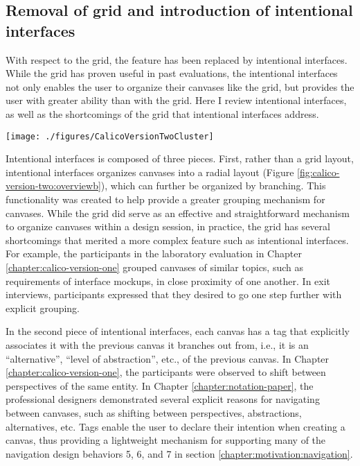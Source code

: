 \subsection{Removal of grid and introduction of intentional interfaces}

With respect to the grid, the feature has been replaced by intentional interfaces. While the grid has proven useful in past evaluations, the intentional interfaces not only enables the user to organize their canvases like the grid, but provides the user with greater ability than with the grid. Here I review intentional interfaces, as well as the shortcomings of the grid that intentional interfaces address. 

\begin{figure*}[tbh]
  \centering
  \texttt{[image: ./figures/CalicoVersionTwoCluster]}
  \caption{Intentional Interfaces - Intention View.}
  \label{fig:calico-version-two:overviewb}
\end{figure*}

Intentional interfaces is composed of three pieces. First, rather than a grid layout, intentional interfaces organizes canvases into a radial layout (Figure \ref{fig:calico-version-two:overviewb}), which can further be organized by branching. This functionality was created to help provide a greater grouping mechanism for canvases. While the grid did serve as an effective and straightforward mechanism to organize canvases within a design session, in practice, the grid has several shortcomings that merited a more complex feature such as intentional interfaces. For example, the participants in the laboratory evaluation in Chapter \ref{chapter:calico-version-one} grouped canvases of similar topics, such as requirements of interface mockups, in close proximity of one another. In exit interviews, participants expressed that they desired to go one step further with explicit grouping. 

In the second piece of intentional interfaces, each canvas has a tag that explicitly associates it with the previous canvas it branches out from, i.e., it is an ``alternative'', ``level of abstraction'', etc., of the previous canvas. In Chapter \ref{chapter:calico-version-one}, the participants were observed to shift between perspectives of the same entity. In Chapter \ref{chapter:notation-paper}, the professional designers demonstrated several explicit reasons for navigating between canvases, such as shifting between perspectives, abstractions, alternatives, etc. Tags enable the user to declare their intention when creating a canvas, thus providing a lightweight mechanism for supporting many of the navigation design behaviors 5, 6, and 7 in section \ref{chapter:motivation:navigation}. 


